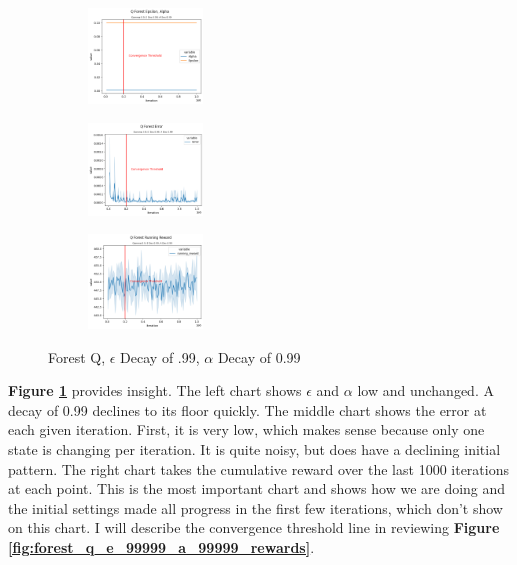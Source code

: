 \documentclass[letterpaper]{article} %
\begin{document}
\begin{figure}[!htb]
	\centering
 	\begin{subfigure}[b]{0.175\textwidth}
		\includegraphics[width=1.2in]{Figures/Q_Forest_Epsilon__Alpha_Gamma_0_9__E_Dec_0_99__A_Dec_0_99.png}
  	\end{subfigure}%
	 \begin{subfigure}[b]{0.175\textwidth}
		\includegraphics[width=1.2in]{Figures/Q_Forest_Error_Gamma_0_9__E_Dec_0_99__A_Dec_0_99.png}
  	\end{subfigure}%
	\begin{subfigure}[b]{0.175\textwidth}
		\includegraphics[width=1.2in]{Figures/Q_Forest_Running_Reward_Gamma_0_9__E_Dec_0_99__A_Dec_0_99.png}
  	\end{subfigure}
\caption{Forest Q,  $\epsilon$ Decay of .99, $\alpha$ Decay of 0.99}
\label{fig:forest_q_e_99_a_99_rewards}
\end{figure}

\textbf{Figure \ref{fig:forest_q_e_99_a_99_rewards}} provides insight.  The left chart shows $\epsilon$ and $\alpha$ low and unchanged.  A decay of 0.99 declines to its floor quickly.  The middle chart shows the error at each given iteration.  First, it is very low, which makes sense because only one state is changing per iteration.  It is quite noisy, but does have a declining initial pattern.  The right chart  takes the cumulative reward over the last 1000 iterations at each point.  This is the most important chart and shows how we are doing and the initial settings made all progress in the first few iterations, which don't show on this chart.  I will describe the convergence threshold line in reviewing \textbf{Figure \ref{fig:forest_q_e_99999_a_99999_rewards}}.
\end{document}
